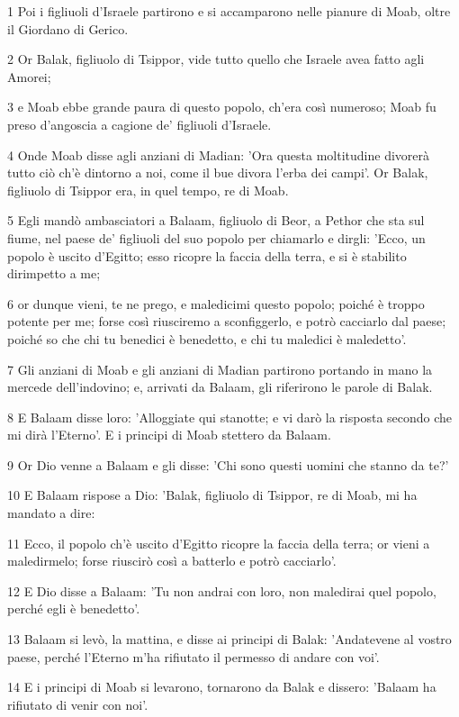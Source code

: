 \par 1 Poi i figliuoli d'Israele partirono e si accamparono nelle pianure di Moab, oltre il Giordano di Gerico.
\par 2 Or Balak, figliuolo di Tsippor, vide tutto quello che Israele avea fatto agli Amorei;
\par 3 e Moab ebbe grande paura di questo popolo, ch'era così numeroso; Moab fu preso d'angoscia a cagione de' figliuoli d'Israele.
\par 4 Onde Moab disse agli anziani di Madian: 'Ora questa moltitudine divorerà tutto ciò ch'è dintorno a noi, come il bue divora l'erba dei campi'. Or Balak, figliuolo di Tsippor era, in quel tempo, re di Moab.
\par 5 Egli mandò ambasciatori a Balaam, figliuolo di Beor, a Pethor che sta sul fiume, nel paese de' figliuoli del suo popolo per chiamarlo e dirgli: 'Ecco, un popolo è uscito d'Egitto; esso ricopre la faccia della terra, e si è stabilito dirimpetto a me;
\par 6 or dunque vieni, te ne prego, e maledicimi questo popolo; poiché è troppo potente per me; forse così riusciremo a sconfiggerlo, e potrò cacciarlo dal paese; poiché so che chi tu benedici è benedetto, e chi tu maledici è maledetto'.
\par 7 Gli anziani di Moab e gli anziani di Madian partirono portando in mano la mercede dell'indovino; e, arrivati da Balaam, gli riferirono le parole di Balak.
\par 8 E Balaam disse loro: 'Alloggiate qui stanotte; e vi darò la risposta secondo che mi dirà l'Eterno'. E i principi di Moab stettero da Balaam.
\par 9 Or Dio venne a Balaam e gli disse: 'Chi sono questi uomini che stanno da te?'
\par 10 E Balaam rispose a Dio: 'Balak, figliuolo di Tsippor, re di Moab, mi ha mandato a dire:
\par 11 Ecco, il popolo ch'è uscito d'Egitto ricopre la faccia della terra; or vieni a maledirmelo; forse riuscirò così a batterlo e potrò cacciarlo'.
\par 12 E Dio disse a Balaam: 'Tu non andrai con loro, non maledirai quel popolo, perché egli è benedetto'.
\par 13 Balaam si levò, la mattina, e disse ai principi di Balak: 'Andatevene al vostro paese, perché l'Eterno m'ha rifiutato il permesso di andare con voi'.
\par 14 E i principi di Moab si levarono, tornarono da Balak e dissero: 'Balaam ha rifiutato di venir con noi'.
